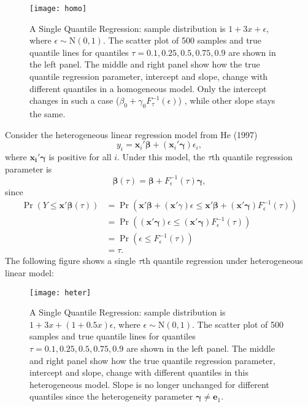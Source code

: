 \documentclass[12pt]{article}
\DeclareMathOperator{\pr}{Pr}
\begin{document}
\begin{figure}[h]
\centerline{\texttt{[image: homo]}}
\caption[]{\label{fig:homo} A Single Quantile Regression: sample
  distribution is $1+3x + \epsilon$, where $\epsilon \sim
  \mathrm{N}(0,1)$. The scatter plot of 500 samples and true quantile
  lines for quantiles $\tau=0.1,0.25,0.5,0.75,0.9$ are shown in the
  left panel. The middle and right panel show how the true quantile
  regression parameter, intercept and slope, change with different
  quantiles in a homogeneous model. Only the intercept changes in such
  a case ($\beta_0+\gamma_0 F^{-1}_{\tau}(\epsilon)$) , while other slope
  stays the same.}
\end{figure}

Consider the heterogeneous linear regression model  from He (1997) 
\begin{displaymath}
y_i = \bm{x}_i'\bm{\beta} + (\bm{x}_i'\bm{\gamma}) \epsilon_i, 
\end{displaymath}
where $\bm{x_i'\gamma}$ is positive  for all
$i$. Under this model, the $\tau$th quantile regression parameter is 
\begin{equation}\label{eq:2}
\bm{\beta}(\tau) = \bm{\beta} + F^{-1}_{\epsilon}(\tau) \bm{\gamma},
\end{equation}
since 
\begin{align*}
\pr (Y \le \bm{x'\beta}(\tau)) & = \pr \left( \bm{x'\beta} +
  (\bm{x}'\gamma) \epsilon \le \bm{x'\beta} + (\bm{x'\gamma})
  F^{-1}_{\epsilon}(\tau) \right) \\
& = \pr \left( (\bm{x'\gamma}) \epsilon \le  (\bm{x'\gamma})
  F^{-1}_{\epsilon}(\tau)  \right)\\
& = \pr (\epsilon \le F^{-1}_{\epsilon}(\tau)) \\
& = \tau .
\end{align*}
The following figure shows a single $\tau$th quantile regression under
heterogeneous linear model:

\begin{figure}[h]
\centerline{\texttt{[image: heter]}}
\caption[]{ \label{fig:heter} A Single Quantile Regression: sample
  distribution is $1+3x + (1+0.5x)\epsilon$, where $\epsilon \sim
  \mathrm{N}(0,1)$. The scatter plot of 500 samples and true quantile
  lines for quantiles $\tau=0.1,0.25,0.5,0.75,0.9$ are shown in the
  left panel. The middle and right panel show how the true quantile
  regression parameter, intercept and slope, change with different
  quantiles in this heterogeneous model. Slope is no longer unchanged
  for different quantiles since the heterogeneity parameter $\bm{\gamma}
  \neq \bm{e}_1$.  }
\end{figure}
\end{document}
